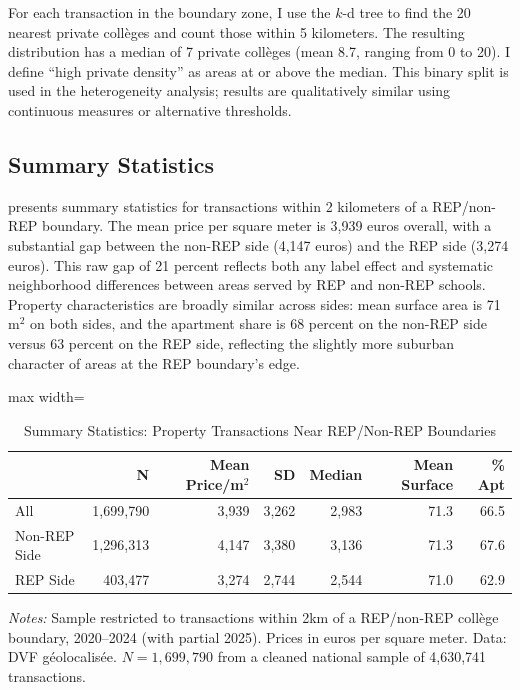 \documentclass[12pt]{article}
\begin{document}
For each transaction in the boundary zone, I use the $k$-d tree to find the 20 nearest private coll\`{e}ges and count those within 5 kilometers. The resulting distribution has a median of 7 private coll\`{e}ges (mean 8.7, ranging from 0 to 20). I define ``high private density'' as areas at or above the median. This binary split is used in the heterogeneity analysis; results are qualitatively similar using continuous measures or alternative thresholds.

\subsection{Summary Statistics}

 presents summary statistics for transactions within 2 kilometers of a REP/non-REP boundary. The mean price per square meter is 3,939 euros overall, with a substantial gap between the non-REP side (4,147 euros) and the REP side (3,274 euros). This raw gap of 21 percent reflects both any label effect and systematic neighborhood differences between areas served by REP and non-REP schools. Property characteristics are broadly similar across sides: mean surface area is 71 m$^2$ on both sides, and the apartment share is 68 percent on the non-REP side versus 63 percent on the REP side, reflecting the slightly more suburban character of areas at the REP boundary's edge.

\begin{table}[htbp]
\centering
\caption{Summary Statistics: Property Transactions Near REP/Non-REP Boundaries}
\label{tab:summary}
\begin{adjustbox}{max width=\textwidth}
\begin{tabular}{lrrrrrr}
\toprule
 & N & Mean Price/m$^2$ & SD & Median & Mean Surface & \% Apt \\
\midrule
All & 1,699,790 & 3,939 & 3,262 & 2,983 & 71.3 & 66.5 \\
Non-REP Side & 1,296,313 & 4,147 & 3,380 & 3,136 & 71.3 & 67.6 \\
REP Side & 403,477 & 3,274 & 2,744 & 2,544 & 71.0 & 62.9 \\
\bottomrule
\end{tabular}
\end{adjustbox}
\begin{tablenotes}
\small
\item \textit{Notes:} Sample restricted to transactions within 2km of a REP/non-REP coll\`{e}ge boundary, 2020--2024 (with partial 2025). Prices in euros per square meter. Data: DVF g\'{e}olocalis\'{e}e. $N = 1{,}699{,}790$ from a cleaned national sample of 4,630,741 transactions.
\end{tablenotes}
\end{table}
\end{document}
